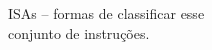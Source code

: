 \documentclass[preview]{standalone}
\begin{document}
ISAs -- formas de classificar esse\\ conjunto de instruções.\\
\end{document}
